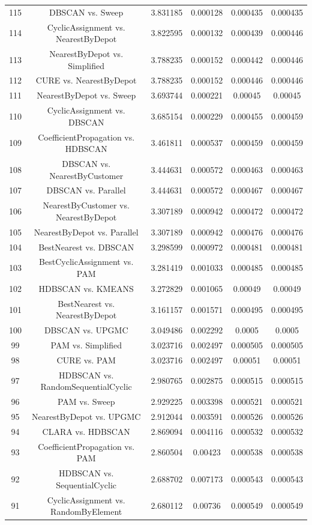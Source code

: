 \documentclass[a4paper,10pt]{article}
\begin{document}
\begin{landscape}
\begin{table}[!htp]
\begin{tabular}{cccccc}
115&DBSCAN vs. Sweep&3.831185&0.000128&0.000435&0.000435\\
114&CyclicAssignment vs. NearestByDepot&3.822595&0.000132&0.000439&0.000446\\
113&NearestByDepot vs. Simplified&3.788235&0.000152&0.000442&0.000446\\
112&CURE vs. NearestByDepot&3.788235&0.000152&0.000446&0.000446\\
111&NearestByDepot vs. Sweep&3.693744&0.000221&0.00045&0.00045\\
110&CyclicAssignment vs. DBSCAN&3.685154&0.000229&0.000455&0.000459\\
109&CoefficientPropagation vs. HDBSCAN&3.461811&0.000537&0.000459&0.000459\\
108&DBSCAN vs. NearestByCustomer&3.444631&0.000572&0.000463&0.000463\\
107&DBSCAN vs. Parallel&3.444631&0.000572&0.000467&0.000467\\
106&NearestByCustomer vs. NearestByDepot&3.307189&0.000942&0.000472&0.000472\\
105&NearestByDepot vs. Parallel&3.307189&0.000942&0.000476&0.000476\\
104&BestNearest vs. DBSCAN&3.298599&0.000972&0.000481&0.000481\\
103&BestCyclicAssignment vs. PAM&3.281419&0.001033&0.000485&0.000485\\
102&HDBSCAN vs. KMEANS&3.272829&0.001065&0.00049&0.00049\\
101&BestNearest vs. NearestByDepot&3.161157&0.001571&0.000495&0.000495\\
100&DBSCAN vs. UPGMC&3.049486&0.002292&0.0005&0.0005\\
99&PAM vs. Simplified&3.023716&0.002497&0.000505&0.000505\\
98&CURE vs. PAM&3.023716&0.002497&0.00051&0.00051\\
97&HDBSCAN vs. RandomSequentialCyclic&2.980765&0.002875&0.000515&0.000515\\
96&PAM vs. Sweep&2.929225&0.003398&0.000521&0.000521\\
95&NearestByDepot vs. UPGMC&2.912044&0.003591&0.000526&0.000526\\
94&CLARA vs. HDBSCAN&2.869094&0.004116&0.000532&0.000532\\
93&CoefficientPropagation vs. PAM&2.860504&0.00423&0.000538&0.000538\\
92&HDBSCAN vs. SequentialCyclic&2.688702&0.007173&0.000543&0.000543\\
91&CyclicAssignment vs. RandomByElement&2.680112&0.00736&0.000549&0.000549\\

\end{tabular}
\end{table}
\end{landscape}
\end{document}
